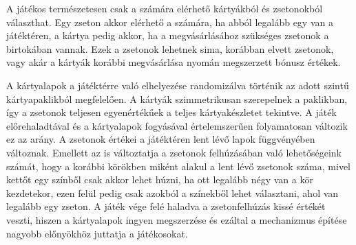 A játékos természetesen csak a számára elérhető kártyákból és zsetonokból választhat. Egy zseton akkor elérhető a számára, ha abból legalább egy van a játéktéren, a kártya pedig akkor, ha a megvásárlásához szükséges zsetonok a birtokában vannak. Ezek a zsetonok lehetnek sima, korábban elvett zsetonok, vagy akár a kártyák korábbi megvásárlása nyomán megszerzett bónusz értékek.

A kártyalapok a játéktérre való elhelyezése randomizálva történik az adott szintű kártyapaklikból megfelelően. A kártyák szimmetrikusan szerepelnek a paklikban, így a zsetonok teljesen egyenértékűek a teljes kártyakészletet tekintve. A játék előrehaladtával és a kártyalapok fogyásával értelemszerűen folyamatosan változik ez az arány. A zsetonok értékei a játéktéren lent lévő lapok függvényében változnak. Emellett az is változtatja a zsetonok felhúzásában való lehetőségeink számát, hogy a korábbi körökben miként alakul a lent lévő zsetonok száma, mivel kettőt egy színből csak akkor lehet húzni, ha ott legalább négy van a kör kezdetekor, ezen felül pedig csak azokból a színekből lehet választani, ahol van legalább egy zseton. A játék vége felé haladva a zsetonfelhúzás kissé értékét veszti, hiszen a kártyalapok ingyen megszerzése és ezáltal a mechanizmus építése nagyobb előnyökhöz juttatja a játékosokat.
